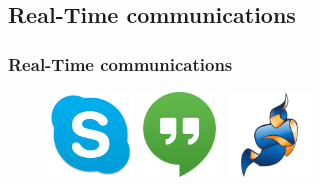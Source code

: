 \documentclass[t]{beamer}
\begin{document}
	\subsection{Real-Time communications}\label{rtc}


		\begin{frame}[c]
		\frametitle{Real-Time communications}
		\begin{figure}
			\includegraphics[width=0.2\textwidth]{figures/skype.png}
			\includegraphics[width=0.2\textwidth]{figures/hangouts.png}
			\includegraphics[width=0.2\textwidth]{figures/jitsi.png}
		\end{figure}
		\end{frame}
\end{document}
